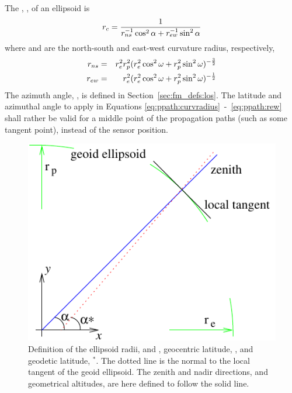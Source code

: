 The , , of an ellipsoid is 
\citep{rodgers:00}
\begin{equation}
 r_{c} = \frac{1}{r_{ns}^{-1}\cos^2 \alpha + r_{ew}^{-1}\sin^2 \alpha}
 \label{eq:ppath:curvradius} 
\end{equation}
where  and  are the north-south and east-west curvature radius, respectively,
\begin{eqnarray}
 r_{ns} &=& r_{e}^2r_{p}^2 (
           r_{e}^2\cos^2\omega+r_{p}^2\sin^2\omega )^{-\frac{3}{2}} \\
 r_{ew} &=& r_{e}^2 (
           r_{e}^2\cos^2\omega+r_{p}^2\sin^2\omega )^{-\frac{1}{2}} 
 \label{eq:ppath:rew} 
\end{eqnarray}
The azimuth angle, \AzmAng, is defined in
Section~\ref{sec:fm_defs:los}. The latitude and azimuthal angle to
apply in Equations \ref{eq:ppath:curvradius}~-~\ref{eq:ppath:rew}
shall rather be valid for a middle point of the propagation paths
(such as some tangent point), instead of the sensor position. 

\begin{figure}[!p]
 \begin{center}
  \begin{minipage}[c]{0.65\textwidth}
   \begin{center}
    \includegraphics*[width=0.9\hsize]{Figs/ppath/latitudes}
   \end{center}
  \end{minipage}%
  \begin{minipage}[c]{0.35\textwidth}
   \caption{Definition of the ellipsoid radii,  and , 
     geocentric latitude, \Lat, and geodetic latitude, \Lat$^*$. The
     dotted line is the normal to the local tangent of the geoid
     ellipsoid. The zenith and nadir directions, and geometrical
     altitudes, are here defined to follow the solid line.}
   \label{fig:ppath:lats}
  \end{minipage}
 \end{center}
\end{figure}   

